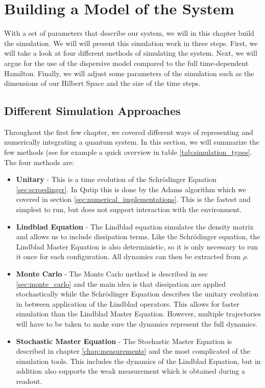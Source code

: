 \chapter{Building a Model of the System}\label{chap:model}
With a set of parameters that describe our system, we will in this chapter build  the simulation. We will will present this simulation work in three steps. First, we will take a look at four different methods of simulating the system. Next, we will argue for the use of the dispersive model compared to the full time-dependent Hamilton. Finally, we will adjust some parameters of the simulation such as the dimensions of our Hilbert Space and the size of the time steps.

\section{Different Simulation Approaches}
Throughout the first few chapter, we covered different ways of representing and numerically integrating a quantum system. In this section, we will summarize the few methods (see for example a quick overview in table \ref{tab:simulation_types}. The four methods are:

\begin{itemize}
    \item \textbf{Unitary} - This is a time evolution of the Schrödinger Equation \ref{sec:scroedinger}. In Qutip this is done by the Adams algorithm which we covered in section \ref{sec:numerical_implementations}. This is the fastest and simplest to run, but does not support interaction with the environment.  
    \item \textbf{Lindblad Equation} - The Lindblad equation simulates the density matrix and allows us to include dissipation terms. Like the Schrödinger equation, the Lindblad Master Equation is also deterministic, so it is only necessary to run it once for each configuration. All dynamics can then be extracted from $\rho$. 
    \item \textbf{Monte Carlo} - The Monte Carlo method is described in sec \ref{sec:monte_carlo} and the main idea is that dissipation are applied stochastically while the Schrödinger Equation describes the unitary evolution in between application of the Lindblad operators. This allows for faster simulation than the Lindblad Master Equation. However, multiple trajectories will have to be taken to make sure the dynamics represent the full dynamics.
    \item \textbf{Stochastic Master Equation} - The Stochastic Master Equation is described in chapter \ref{chap:measurements} and the most complicated of the simulation tools. This includes the dynamics of the Lindblad Equation, but in addition also supports the weak measurement which is obtained during a readout.
\end{itemize}

